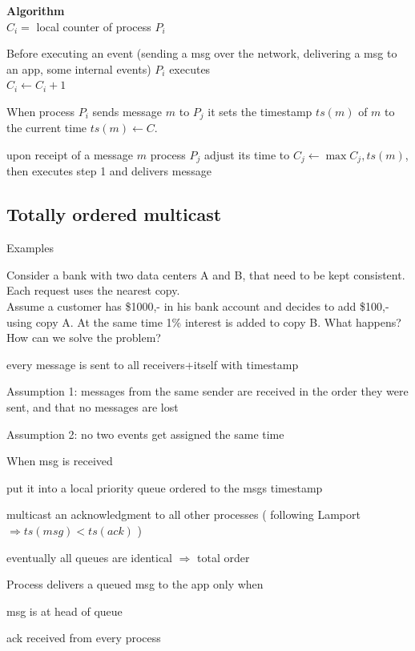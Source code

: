 \documentclass[ngerman,a4paper]{report}
\begin{document}
\textbf{Algorithm} \\
 $C_i =$ local counter of process $P_i$

\begin{compactenum}
\item Before executing an event (sending a msg over the network, delivering a msg to an app, some internal events) $P_i$ executes\\
$C_i \leftarrow C_i + 1$
\item When process $P_i$ sends message $m$ to $P_j$ it sets the timestamp $ts(m)$ of $m$ to the current time $ts(m) \leftarrow C$.
\item upon receipt of a message $m$ process $P_j$ adjust its time to $C_j \leftarrow \max{C_j, ts(m)}$, then executes step 1 and delivers message
\end{compactenum}

\subsection{Totally ordered multicast}
Examples
\begin{compactitem}
\item Consider a bank with two data centers A and B, that need to be kept consistent. Each request uses the nearest copy. \\
Assume a customer has \$1000,- in his bank account and decides to add \$100,- using copy A. At the same time 1\% interest is added to copy B. What happens? How can we solve the problem?

\begin{compactitem}
	\item  every message is sent to all receivers+itself with timestamp
	\item Assumption 1: messages from the same sender are received in the order they were sent, and that no messages are lost
	\item Assumption 2: no two events get assigned the same time
	\item When msg is received
	\begin{compactenum}
		\item put it into a local priority queue ordered to the msgs timestamp
		\item multicast an acknowledgment to all other processes ( following Lamport $\Rightarrow ts(msg) < ts(ack)$ )
	\end{compactenum}
	\item eventually all queues are identical $\Rightarrow$ total order
	\item Process delivers a queued msg to the app only when
	\begin{compactenum}
		\item msg is at head of queue
		\item ack received from every process
	\end{compactenum}

\end{compactitem}

\end{compactitem}
\end{document}

